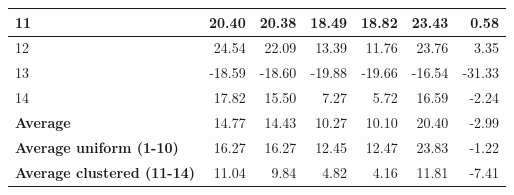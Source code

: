 \documentclass[11pt,a4paper,oneside]{book}
\begin{document}
\begin{table}[]
\begin{tabular}{|l|r|r|r|r|r|r|}
11                           & 20.40                  & 20.38                  & 18.49                   & 18.82                  & 23.43                   & 0.58                     \\ \hline
12                           & 24.54                 & 22.09                  & 13.39                   & 11.76                  & 23.76                   & 3.35                     \\ \hline
13                           & -18.59                & -18.60                  & -19.88                  & -19.66                 & -16.54                  & -31.33                   \\ \hline
14                           & 17.82                 & 15.50                   & 7.27                    & 5.72                   & 16.59                   & -2.24                    \\ \hline
\textbf{Average}                      & 14.77                 & 14.43                  & 10.27                   & 10.10                   & 20.40                    & -2.99                    \\ \hline
\textbf{Average uniform (1-10)}    & 16.27                 & 16.27                  & 12.45                   & 12.47                  & 23.83                   & -1.22                    \\ \hline
\textbf{Average clustered (11-14)} & 11.04                 & 9.84                   & 4.82                    & 4.16                   & 11.81                   & -7.41                    \\ \hline
\end{tabular}
\end{table}
\end{document}
